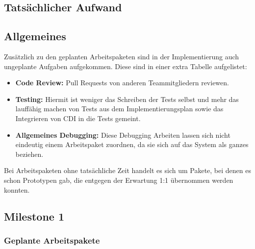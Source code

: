 \begin{landscape}
	
	\section{Tatsächlicher Aufwand}\label{sec:aufwand}
	
	\subsection{Allgemeines}
	
	Zusätzlich zu den geplanten Arbeitspaketen sind in der Implementierung auch ungeplante Aufgaben aufgekommen. Diese sind in einer extra Tabelle aufgelistet:
	\begin{itemize}
		\item \textbf{Code Review:} Pull Requests von anderen Teammitgliedern reviewen.
		\item \textbf{Testing:} Hiermit ist weniger das Schreiben der Tests selbst und mehr das lauffähig machen von Tests aus dem Implementierungsplan sowie das Integrieren von CDI in die Tests gemeint.
		\item \textbf{Allgemeines Debugging:} Diese Debugging Arbeiten lassen sich nicht eindeutig einem Arbeitspaket zuordnen, da sie sich auf das System als ganzes beziehen.
	\end{itemize}
	Bei Arbeitspaketen ohne tatsächliche Zeit handelt es sich um Pakete, bei denen es schon Prototypen gab, die entgegen der Erwartung 1:1 übernommen werden konnten.

	\subsection{Milestone 1}
	\subsubsection{Geplante Arbeitspakete}
\end{landscape}
